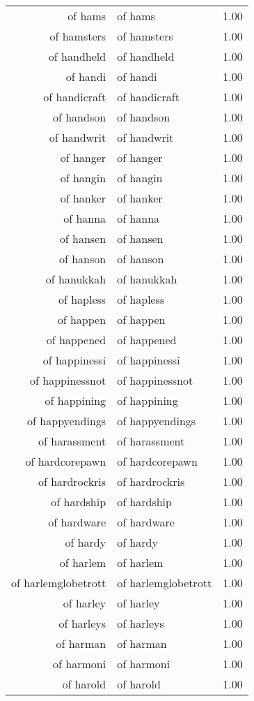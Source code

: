\begin{table}[ht]
\begin{tabular}{rlr}
  of hams & of hams & 1.00 \\ 
  of hamsters & of hamsters & 1.00 \\ 
  of handheld & of handheld & 1.00 \\ 
  of handi & of handi & 1.00 \\ 
  of handicraft & of handicraft & 1.00 \\ 
  of handson & of handson & 1.00 \\ 
  of handwrit & of handwrit & 1.00 \\ 
  of hanger & of hanger & 1.00 \\ 
  of hangin & of hangin & 1.00 \\ 
  of hanker & of hanker & 1.00 \\ 
  of hanna & of hanna & 1.00 \\ 
  of hansen & of hansen & 1.00 \\ 
  of hanson & of hanson & 1.00 \\ 
  of hanukkah & of hanukkah & 1.00 \\ 
  of hapless & of hapless & 1.00 \\ 
  of happen & of happen & 1.00 \\ 
  of happened & of happened & 1.00 \\ 
  of happinessi & of happinessi & 1.00 \\ 
  of happinessnot & of happinessnot & 1.00 \\ 
  of happining & of happining & 1.00 \\ 
  of happyendings & of happyendings & 1.00 \\ 
  of harassment & of harassment & 1.00 \\ 
  of hardcorepawn & of hardcorepawn & 1.00 \\ 
  of hardrockris & of hardrockris & 1.00 \\ 
  of hardship & of hardship & 1.00 \\ 
  of hardware & of hardware & 1.00 \\ 
  of hardy & of hardy & 1.00 \\ 
  of harlem & of harlem & 1.00 \\ 
  of harlemglobetrott & of harlemglobetrott & 1.00 \\ 
  of harley & of harley & 1.00 \\ 
  of harleys & of harleys & 1.00 \\ 
  of harman & of harman & 1.00 \\ 
  of harmoni & of harmoni & 1.00 \\ 
  of harold & of harold & 1.00 \\ 

\end{tabular}
\end{table}
